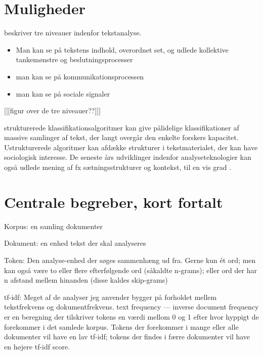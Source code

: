 \section{Muligheder}

\citeauthor{evansMachineTranslationMining2016} beskriver tre niveauer indenfor tekstanalyse.
\begin{itemize}
  \item
    Man kan se på tekstens indhold, overordnet set, og udlede kollektive tankemønstre og beslutningsprocesser
  \item
    man kan se på kommunikationsprocessen
  \item
    man kan se på sociale signaler
\end{itemize}

[[[figur over de tre niveauer??]]]

strukturerede klassifikationsalgoritmer kan give pålidelige klassifikationer af massive samlinger af tekst, der langt overgår den enkelte forskers kapacitet.
Ustrukturerede algoritmer kan afdække strukturer i tekstmaterialet, der kan have sociologisk interesse.
De seneste års udviklinger indenfor analyseteknologier kan også udlede mening af fx sætningsstrukturer og kontekst, til en vis grad \autocite[s. 22]{evansMachineTranslationMining2016}.

\section{Centrale begreber, kort fortalt}

Korpus: en samling dokumenter

Dokument: en enhed tekst der skal analyseres

Token: Den analyse-enhed der søges sammenhæng ud fra.
Gerne kun ét ord; men kan også være to eller flere efterfølgende ord (såkaldte n-grams); eller ord der har n afstand mellem hinanden (disse kaldes skip-grams)

tf-idf: Meget af de analyser jeg anvender bygger på forholdet mellem tekstfrekvens og dokumentfrekvens.
text frequency — inverse document frequency er en beregning der tilskriver tokens en værdi mellom 0 og 1 efter hvor hyppigt de forekommer i det samlede korpus.
Tokens der forekommer i mange eller alle dokumenter vil have en lav tf-idf; tokens der findes i færre dokumenter vil have en højere tf-idf score.

